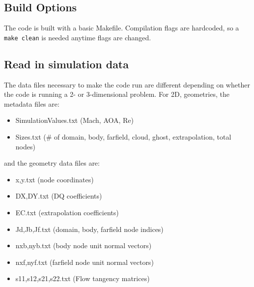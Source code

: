 \documentclass[12pt]{article}
\begin{document}
    \subsection{Build Options}
    The code is built with a basic Makefile. Compilation flags are hardcoded, so a \texttt{make clean} is needed anytime flags are changed.

    \subsection{Read in simulation data}
    The data files necessary to make the code run are different depending on whether the code is running a 2- or 3-dimensional problem. For 2D, geometries, the metadata files are:
    \begin{itemize}
        \item SimulationValues.txt (Mach, AOA, Re)
        \item Sizes.txt (\# of domain, body, farfield, cloud, ghost, extrapolation, total nodes)
    \end{itemize}
    and the geometry data files are:
    \begin{itemize}
        \item x,y.txt (node coordinates)
        \item DX,DY.txt (DQ coefficients)
        \item EC.txt (extrapolation coefficients)
        \item Jd,Jb,Jf.txt (domain, body, farfield node indices)
        \item nxb,nyb.txt (body node unit normal vectors)
        \item nxf,nyf.txt (farfield node unit normal vectors)
        \item s11,s12,s21,s22.txt (Flow tangency matrices)
    \end{itemize}
\end{document}
